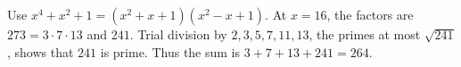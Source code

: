 Use $x^4+x^2+1=(x^2+x+1)(x^2-x+1)$. At $x=16$, the factors are $273=3\cdot7\cdot13$ and $241$. Trial division by $2,3,5,7,11,13$, the primes at most $\sqrt{241}$, shows that $241$ is prime. Thus the sum is $3+7+13+241=\boxed{264}$.
